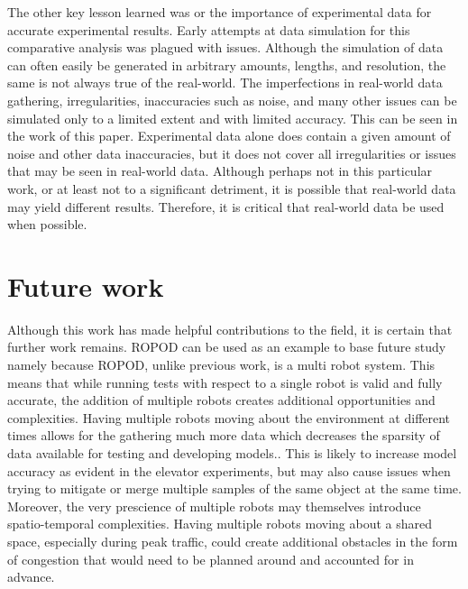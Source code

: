     The other key lesson learned was or the importance of experimental
    data for accurate experimental results. Early attempts at data simulation
    for this comparative analysis was plagued with issues. Although
    the simulation of data can often easily be generated in arbitrary amounts,
    lengths, and resolution, the same is not always true of the real-world.
    The imperfections in real-world data gathering, irregularities,
    inaccuracies such as noise, and many other issues can be simulated
    only to a limited extent and with limited accuracy. This can be seen in the
    work of this paper. Experimental data alone does contain a given amount of noise
    and other data inaccuracies, but it does not cover all irregularities or
    issues that may be seen in real-world data. Although perhaps not in this
    particular work, or at least not to a significant detriment, it is possible that
    real-world data may yield different results. Therefore, it is critical
    that real-world data be used when possible. \\

    \section{ Future work }

    Although this work has made helpful contributions to the field, it is
    certain that further work remains. ROPOD can be used as an example
    to base future study namely because ROPOD, unlike previous work, is a multi robot
    system. This means that while running tests with respect to a single robot
    is valid and fully accurate, the addition of multiple robots creates
    additional opportunities and complexities. Having multiple robots moving about
    the environment at different times allows for the gathering much
    more data which decreases the sparsity of data
    available for testing and developing models.. This is likely to increase model accuracy as evident in the
    elevator experiments, but may also cause issues when trying to mitigate
    or merge multiple samples of the same object at the same time. Moreover,
    the very prescience of multiple robots may themselves introduce spatio-temporal
    complexities. Having multiple robots moving about a shared
    space, especially during peak traffic, could create additional obstacles
    in the form of congestion that would need to be planned around
    and accounted for in advance. \\

